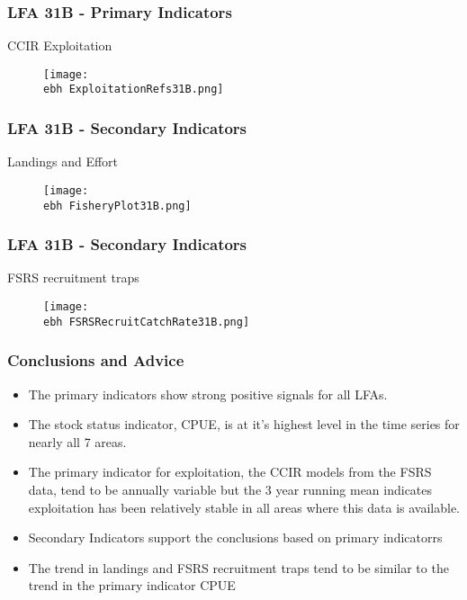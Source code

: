 \documentclass{beamer}
\newcommand{\ebh}{\string~/bio.data/bio.lobster/figures/Assessment/LFA2732/} %
\begin{document}
\begin{frame}
\frametitle{LFA 31B - Primary Indicators}
CCIR Exploitation 
\begin{figure}
        \begin{center}
            \texttt{[image: \\ebh ExploitationRefs31B.png]}
        \end{center}
    \end{figure}
\end{frame}




\begin{frame}
\frametitle{LFA 31B - Secondary Indicators}
Landings and Effort
\begin{figure}
        \begin{center}
            \texttt{[image: \\ebh FisheryPlot31B.png]}
        \end{center}
    \end{figure}
\end{frame}



\begin{frame}
\frametitle{LFA 31B - Secondary Indicators}
FSRS recruitment traps
\begin{figure}
        \begin{center}
            \texttt{[image: \\ebh FSRSRecruitCatchRate31B.png]}
        \end{center}
    \end{figure}
\end{frame}




\begin{frame}
\frametitle{Conclusions and Advice}
\begin{itemize}

\item The primary indicators show strong positive signals for all LFAs. 
\item The stock status indicator, CPUE, is at it’s highest level in the time series for nearly all 7 areas. 
\item The primary indicator for exploitation, the CCIR models from the FSRS data, tend to be annually variable but the 3 year running mean indicates exploitation has been relatively stable in all areas where this data is available. 
\item Secondary Indicators support the conclusions based on primary indicatorrs
\item The trend in landings and FSRS recruitment traps tend to be similar to the trend in the primary indicator CPUE
\end{itemize}
\end{frame}
\end{document}
